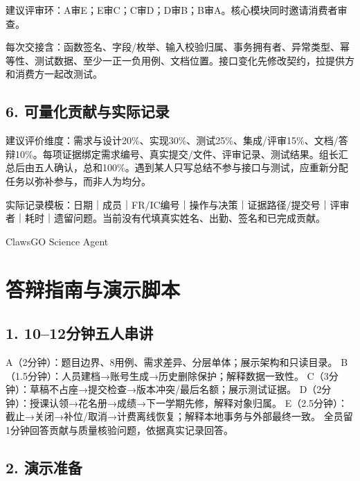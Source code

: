 \documentclass[UTF8,11pt,a4paper]{ctexart}
\begin{document}
建议评审环：A审E；E审C；C审D；D审B；B审A。核心模块同时邀请消费者审查。

每次交接含：函数签名、字段/枚举、输入校验归属、事务拥有者、异常类型、幂等性、测试数据、至少一正一负用例、文档位置。接口变化先修改契约，拉提供方和消费方一起改测试。

\hypertarget{6-ux53efux91cfux5316ux8d21ux732eux4e0eux5b9eux9645ux8bb0ux5f55}{%
\subsection{6.
可量化贡献与实际记录}\label{6-ux53efux91cfux5316ux8d21ux732eux4e0eux5b9eux9645ux8bb0ux5f55}}

建议评价维度：需求与设计20\%、实现30\%、测试25\%、集成/评审15\%、文档/答辩10\%。每项证据绑定需求编号、真实提交/文件、评审记录、测试结果。组长汇总后由五人确认，总和100\%。遇到某人只写总结不参与接口与测试，应重新分配任务以弥补参与，而非人为均分。

实际记录模板：日期｜成员｜FR/IC编号｜操作与决策｜证据路径/提交号｜评审者｜耗时｜遗留问题。当前没有代填真实姓名、出勤、签名和已完成贡献。

ClawsGO Science Agent

\clearpage
\hypertarget{ux7b54ux8fa9ux6307ux5357ux4e0eux6f14ux793aux811aux672c}{%
\section{答辩指南与演示脚本}\label{ux7b54ux8fa9ux6307ux5357ux4e0eux6f14ux793aux811aux672c}}

\hypertarget{1-1012ux5206ux949fux4e94ux4ebaux4e32ux8bb2}{%
\subsection{1.
10--12分钟五人串讲}\label{1-1012ux5206ux949fux4e94ux4ebaux4e32ux8bb2}}

A（2分钟）：题目边界、8用例、需求差异、分层单体；展示架构和只读目录。
B（1.5分钟）：人员建档→账号生成→历史删除保护；解释数据一致性。
C（3分钟）：草稿不占座→提交检查→版本冲突/最后名额；展示测试证据。
D（2分钟）：授课认领→花名册→成绩→下一学期先修，解释对象归属。
E（2.5分钟）：截止→关闭→补位/取消→计费离线恢复；解释本地事务与外部最终一致。
全员留1分钟回答贡献与质量核验问题，依据真实记录回答。

\hypertarget{2-ux6f14ux793aux51c6ux5907}{%
\subsection{2. 演示准备}\label{2-ux6f14ux793aux51c6ux5907}}
\end{document}
